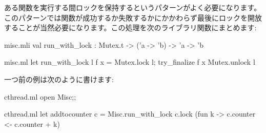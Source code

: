 ある関数を実行する間ロックを保持するというパターンがよく必要になります。このパターンでは関数が成功するか失敗するかにかかわらず最後にロックを開放することが当然必要になります。この処理を次のライブラリ関数にまとめます:
\begin{codefile}{misc.mli}
val run_with_lock : Mutex.t -> ('a -> 'b) -> 'a -> 'b
\end{codefile}
\begin{listingcodefile}{misc.ml}
let run_with_lock l f x =
  Mutex.lock l; try_finalize f x Mutex.unlock l
\end{listingcodefile}
一つ前の例は次のように書けます:
\begin{codefile}{cthread.ml}
open Misc;;
\end{codefile}
\begin{listingcodefile}{cthread.ml}
let addtocounter c =
  Misc.run_with_lock c.lock (fun k -> c.counter <- c.counter + k)
\end{listingcodefile}

